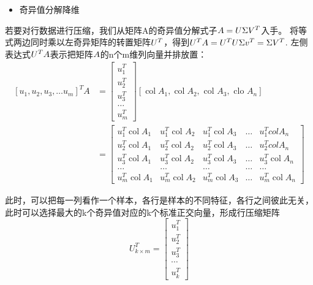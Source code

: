 \documentclass[UTF8,a4paper,AutoFakeBold,AutoFakeSlant]{article}
\begin{document}
\begin{itemize}
  \item 奇异值分解降维
\end{itemize}

若要对行数据进行压缩，我们从矩阵\large A的奇异值分解式子$\large A = U\Sigma V^T$入手。
将等式两边同时乘以左奇异矩阵的转置矩阵$\large U^T$，得到$\large U^TA = U^TU\Sigma v^T = \Sigma V^T$.
左侧表达式$\large U^TA$表示把矩阵$\large A$的n个m维列向量并排放置：
\begin{equation*}
  \begin{aligned}
  \left[u_{1}, u_{2}, u_{3}, \ldots u_{m}\right]^{T} A & =\left[\begin{array}{c}
    u_{1}^{T} \\
    u_{2}^{T} \\
    u_{3}^{T} \\
    \ldots \\
    u_{m}^{T}
    \end{array}\right]\left[\operatorname{col} A_{1}, \operatorname{col} A_{2}, \text { col } A_{3}, \text { clo } A_{n}\right]\\&=\left[\begin{array}{ccccc}
    u_{1}^{T} \operatorname{col} A_{1} & u_{1}^{T} \text { col } A_{2} & u_{1}^{T} \operatorname{col} A_{3} & \ldots & u_{1}^{T} c o l A_{n} \\
    u_{2}^{T} \operatorname{col} A_{1} & u_{2}^{T} \operatorname{col} A_{2} & u_{2}^{T} \operatorname{col} A_{3} & \ldots & u_{2}^{T} c o l A_{n} \\
    u_{3}^{T} \operatorname{col} A_{1} & u_{3}^{T} \operatorname{col} A_{2} & u_{3}^{T} \operatorname{col} A_{3} & \ldots & u_{3}^{T} \operatorname{col} A_{n} \\
    \ldots & \ldots & \ldots & \ldots & \ldots \\
    u_{m}^{T} \operatorname{col} A_{1} & u_{m}^{T} \operatorname{col} A_{2} & u_{m}^{T} \operatorname{col} A_{3} & \ldots & u_{m}^{T} \operatorname{col} A_{n}
    \end{array}\right]
  \end{aligned}
\end{equation*}

此时，可以把每一列看作一个样本，各行是样本的不同特征，各行之间彼此无关，
此时可以选择最大的k个奇异值对应的k个标准正交向量，形成行压缩矩阵
$$ U_{k \times m}^{T}=\left[\begin{array}{c}
  u_{1}^{T} \\
  u_{2}^{T} \\
  u_{3}^{T} \\
  \cdots \\
  u_{k}^{T}
  \end{array}\right] $$
\end{document}
